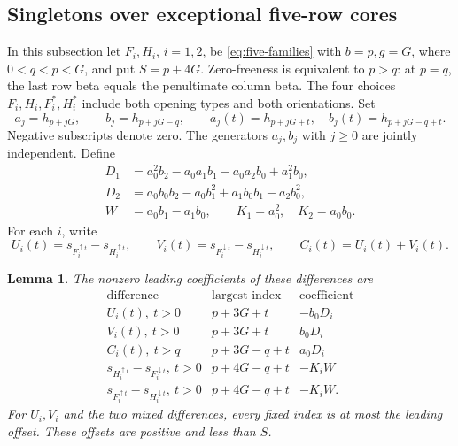 \documentclass[11pt,a4paper]{amsart}
\numberwithin{equation}{section}
\theoremstyle{plain}
\newtheorem{lemma}[theorem]{Lemma}
\theoremstyle{definition}
\begin{document}
\subsection{Singletons over exceptional five-row cores}

In this subsection let \(F_i,H_i\), \(i=1,2\), be
\eqref{eq:five-families} with \(b=p,g=G\), where
\(0<q<p<G\), and put \(S=p+4G\).
Zero-freeness is equivalent to \(p>q\): at \(p=q\), the last row
beta equals the penultimate column beta.  The four choices
\(F_i,H_i,F_i^*,H_i^*\) include both opening types and both orientations.
Set
\[
 a_j=h_{p+jG},\qquad b_j=h_{p+jG-q},\qquad
 a_j(t)=h_{p+jG+t},\quad b_j(t)=h_{p+jG-q+t}.
\]
Negative subscripts denote zero.  The generators \(a_j,b_j\) with
\(j\ge0\) are jointly independent.
Define
\begin{equation}\label{eq:exceptional-five-coefficients}
 \begin{aligned}
 D_1&=a_0^2b_2-a_0a_1b_1-a_0a_2b_0+a_1^2b_0,\\
 D_2&=a_0b_0b_2-a_0b_1^2+a_1b_0b_1-a_2b_0^2,\\
 W&=a_0b_1-a_1b_0,\qquad K_1=a_0^2,\quad K_2=a_0b_0.
 \end{aligned}
\end{equation}
For each \(i\), write
\[
 U_i(t)=s_{F_i^{\uparrow t}}-s_{H_i^{\uparrow t}},\qquad
 V_i(t)=s_{F_i^{\downarrow t}}-s_{H_i^{\downarrow t}},\qquad
 C_i(t)=U_i(t)+V_i(t).
\]

\begin{lemma}\label{lem:exceptional-five-responses}
The nonzero leading coefficients of these differences are
\begin{equation}\label{eq:exceptional-five-response-table}
 \begin{array}{c|c|c}
 \text{difference}&\text{largest index}&\text{coefficient}\\\hline
 U_i(t),\ t>0&p+3G+t&-b_0D_i\\
 V_i(t),\ t>0&p+3G+t&b_0D_i\\
 C_i(t),\ t>q&p+3G-q+t&a_0D_i\\
 s_{H_i^{\uparrow t}}-s_{F_i^{\downarrow t}},\ t>0
   &p+4G-q+t&-K_iW\\
 s_{F_i^{\uparrow t}}-s_{H_i^{\downarrow t}},\ t>0
   &p+4G-q+t&-K_iW.
 \end{array}
\end{equation}
For \(U_i,V_i\) and the two mixed differences, every fixed index is at
most the leading offset.  These offsets are positive and less than \(S\).
\end{lemma}
\end{document}
